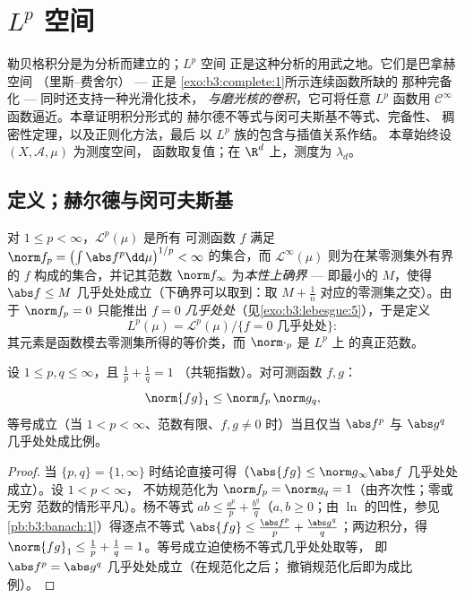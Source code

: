 \chapter{\texorpdfstring{$L^p$}{Lp} 空间}\label{ch:b3:lp}

勒贝格积分是为分析而建立的；$L^p$ 空间
正是这种分析的用武之地。它们是巴拿赫空间
（里斯–费舍尔） --- 正是
\cref{exo:b3:complete:1}所示连续函数所缺的
那种完备化 --- 同时还支持一种光滑化技术，
\emph{与磨光核的卷积}，它可将任意
$L^p$ 函数用 $\mathcal C^\infty$ 函数逼近。本章证明积分形式的
赫尔德不等式与闵可夫斯基不等式、完备性、
稠密性定理，以及正则化方法，最后
以 $L^p$ 族的包含与插值关系作结。
本章始终设 $(X, \mathcal A, \mu)$ 为测度空间，
函数取复值；在 $\R^d$ 上，测度为
$\lambda_d$。

\section{定义；赫尔德与闵可夫斯基}

\begin{definition}\label{def:b3:lp:space}
对 $1 \leq p < \infty$，$\mathcal L^p(\mu)$ 是所有
可测函数 $f$ 满足 $\norm f_p = \bigl(\int\abs
f^p\dd\mu\bigr)^{1/p} < \infty$ 的集合，而 $\mathcal L^\infty(\mu)$
则为在某零测集外有界的 $f$ 构成的集合，并记其范数 $\norm
f_\infty$ 为\emph{本性上确界} --- 即最小的 $M$，使得
$\abs f \leq M$ 几乎处处成立（下确界可以取到：取
$M + \frac1n$ 对应的零测集之交）。由于 $\norm f_p = 0$ 只能推出 $f
= 0$ \emph{几乎处处}（见\cref{exo:b3:lebesgue:5}），于是定义
\[
L^p(\mu) = \mathcal L^p(\mu)/\{f = 0 \text{ 几乎处处}\} :
\]
其元素是函数模去零测集所得的等价类，而
$\norm\cdot_p$ 是 $L^p$ 上
的真正范数。
\end{definition}

\begin{theorem}[赫尔德不等式]\label{thm:b3:lp:holder}
设 $1 \leq p, q \leq \infty$，且 $\frac1p + \frac1q = 1$
（共轭指数）。对可测函数 $f, g$：
\[
\norm{fg}_1 \leq \norm f_p\,\norm g_q ,
\]
等号成立（当 $1 < p < \infty$、范数有限、$f,g\ne0$ 时）当且仅当
$\abs f^p$ 与 $\abs g^q$ 几乎处处成比例。
\end{theorem}

\begin{proof}
当 $\{p, q\} = \{1, \infty\}$ 时结论直接可得（$\abs{fg} \leq
\norm g_\infty\abs f$ 几乎处处成立）。设 $1 < p < \infty$，
不妨规范化为 $\norm f_p = \norm g_q = 1$（由齐次性；零或无穷
范数的情形平凡）。杨不等式 $ab \leq \frac{a^p}p +
\frac{b^q}q$（$a, b \geq 0$；由 $\ln$ 的凹性，参见
\cref{pb:b3:banach:1}）得逐点不等式 $\abs{f g} \leq
\frac{\abs f^p}p + \frac{\abs g^q}q$；两边积分，得 $\norm{fg}_1
\leq \frac1p + \frac1q = 1$。等号成立迫使杨不等式几乎处处取等，
即 $\abs f^p = \abs g^q$ 几乎处处成立（在规范化之后；
撤销规范化后即为成比例）。
\end{proof}

